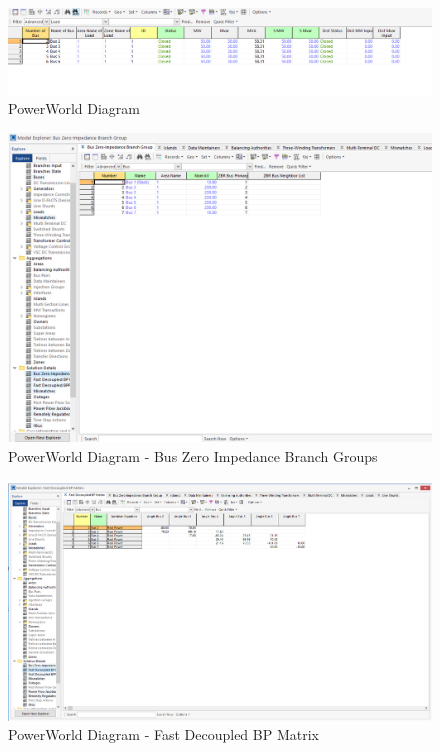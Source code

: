 \documentclass[12pt]{article}
\begin{document}
        \begin{figure}[H]
            \centerline{\includegraphics[scale=0.3]{images/PowerWorldTable4}}
            \caption{PowerWorld Diagram}
        \end{figure}
        \begin{figure}[H]
            \centerline{\includegraphics[scale=0.3]{images/PowerWorldTable5}}
            \caption{PowerWorld Diagram - Bus Zero Impedance Branch Groups}
        \end{figure}
        \begin{figure}[H]
            \centerline{\includegraphics[scale=0.3]{images/PowerWorldTable6}}
            \caption{PowerWorld Diagram - Fast Decoupled BP Matrix}
        \end{figure}
\end{document}
